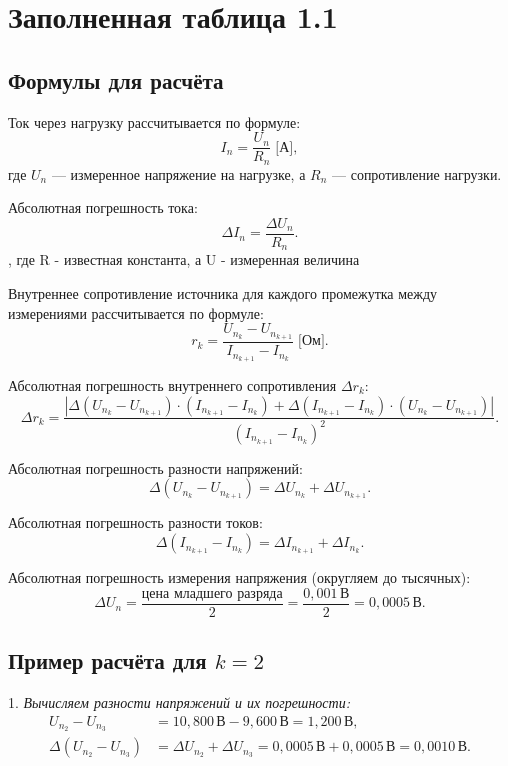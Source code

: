 \section{Заполненная таблица 1.1}

\subsection{Формулы для расчёта}

Ток через нагрузку рассчитывается по формуле:
\[
	I_n = \frac{U_n}{R_n} \; \text{[А]},
\]
где \( U_n \) — измеренное напряжение на нагрузке, а \( R_n \) — сопротивление нагрузки.

Абсолютная погрешность тока:
\[
	\Delta I_n = \frac{\Delta U_n}{R_n}.
\]
, где R - известная константа, а U - измеренная величина

Внутреннее сопротивление источника для каждого промежутка между измерениями рассчитывается по формуле:
\[
	r_k = \frac{U_{n_k} - U_{n_{k+1}}}{I_{n_{k+1}} - I_{n_k}} \; \text{[Ом]}.
\]

Абсолютная погрешность внутреннего сопротивления \( \Delta r_k \):
\[
	\Delta r_k = \frac{|\Delta(U_{n_k} - U_{n_{k+1}}) \cdot (I_{n_{k+1}} - I_{n_k}) + \Delta(I_{n_{k+1}} - I_{n_k}) \cdot (U_{n_k} - U_{n_{k+1}})|}{(I_{n_{k+1}} - I_{n_k})^2}.
\]

Абсолютная погрешность разности напряжений:
\[
	\Delta(U_{n_k} - U_{n_{k+1}}) = \Delta U_{n_k} + \Delta U_{n_{k+1}}.
\]

Абсолютная погрешность разности токов:
\[
	\Delta(I_{n_{k+1}} - I_{n_k}) = \Delta I_{n_{k+1}} + \Delta I_{n_k}.
\]

Абсолютная погрешность измерения напряжения (округляем до тысячных):
\[
	\Delta U_n = \frac{\text{цена младшего разряда}}{2} = \frac{0{,}001\,\text{В}}{2} = 0{,}0005\,\text{В}.
\]

\subsection{Пример расчёта для \( k = 2 \)}

1. \textit{Вычисляем разности напряжений и их погрешности:}
\begin{align*}
	U_{n_2} - U_{n_3}         & = 10{,}800\,\text{В} - 9{,}600\,\text{В} = 1{,}200\,\text{В},                                     \\
	\Delta(U_{n_2} - U_{n_3}) & = \Delta U_{n_2} + \Delta U_{n_3} = 0{,}0005\,\text{В} + 0{,}0005\,\text{В} = 0{,}0010\,\text{В}.
\end{align*}

